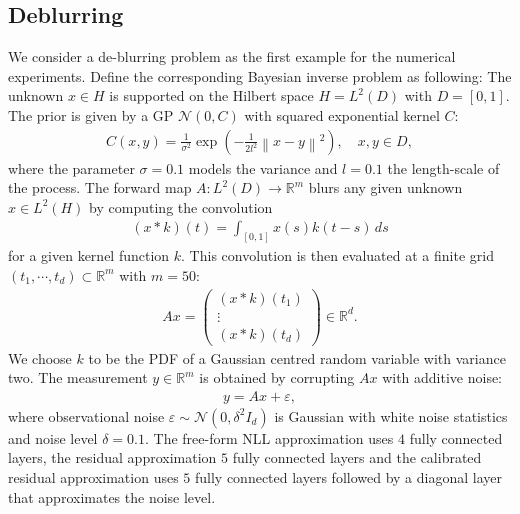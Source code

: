\documentclass{amsart}
\theoremstyle{definition}
\newcommand{\R}{{\mathbb R}}
\newcommand{\norm}[1]{\left\|#1\right\|}
\newcommand{\N}{\mathcal{N}}
\begin{document}
\subsection{Deblurring}
We consider a de-blurring problem as the first example for the numerical experiments. Define  the corresponding Bayesian inverse problem as following:
The unknown $x \in H$ is supported on the Hilbert space $H = L^2(D)$ with $D = [0, 1]$.
The prior is given by a GP $\N(0, C)$ with squared exponential kernel $C$:
\begin{eqnarray*}
    C(x, y) = \frac{1}{\sigma^2}\exp\left(-\frac{1}{2l^2}\norm{x-y}^2 \right), \quad x, y \in D, 
\end{eqnarray*}
where the parameter $\sigma = 0.1$ models the variance and $l =0.1$ the length-scale of the process.
The forward map $A: L^2(D) \rightarrow \R^m$ blurs any given unknown $x \in L^2(H)$ by computing the convolution
\begin{eqnarray*}
    \left( x \ast k \right)(t) = \int_{[0, 1]} x(s) k(t-s) \, ds
\end{eqnarray*}
for a given kernel function $k$. This convolution is then evaluated at a finite grid $(t_1, \cdots, t_d) \subset \R^m$ with $m = 50$:
\begin{eqnarray*}
    Ax=\begin{pmatrix}
    (x * k)(t_1) \\
    \vdots \\
    (x * k)(t_d)
    \end{pmatrix}\in \mathbb{R}^d .
\end{eqnarray*}
We choose $k$ to be the PDF of a Gaussian centred random variable with variance two. The measurement $y \in \R^m$ is obtained by corrupting $Ax$ with additive noise:
\begin{eqnarray*}
    y = Ax + \varepsilon,
\end{eqnarray*}
where observational noise $\varepsilon \sim \N(0, \delta^2 I_d)$ is Gaussian with white noise statistics and noise level $\delta = 0.1$. 
The free-form NLL approximation uses $4$ fully connected layers, the residual approximation $5$ fully connected layers and the calibrated residual approximation uses $5$ fully connected layers followed by a diagonal layer that approximates the noise level.
\end{document}
